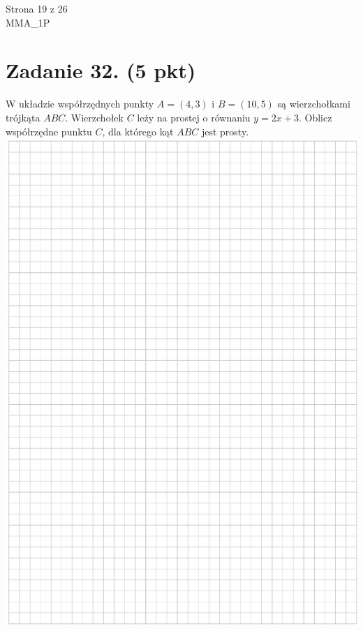 \documentclass[10pt]{article}
\begin{document}
Strona 19 z 26\\
MMA\_1P

\section*{Zadanie 32. (5 pkt)}
W układzie współrzędnych punkty \(A=(4,3)\) i \(B=(10,5)\) są wierzchołkami trójkąta \(A B C\). Wierzchołek \(C\) leży na prostej o równaniu \(y=2 x+3\). Oblicz współrzędne punktu \(C\), dla którego kąt \(A B C\) jest prosty.\\
\includegraphics[max width=\textwidth, center]{2024_11_21_9383c97fb44abf35abe9g-20}\\
\end{document}
